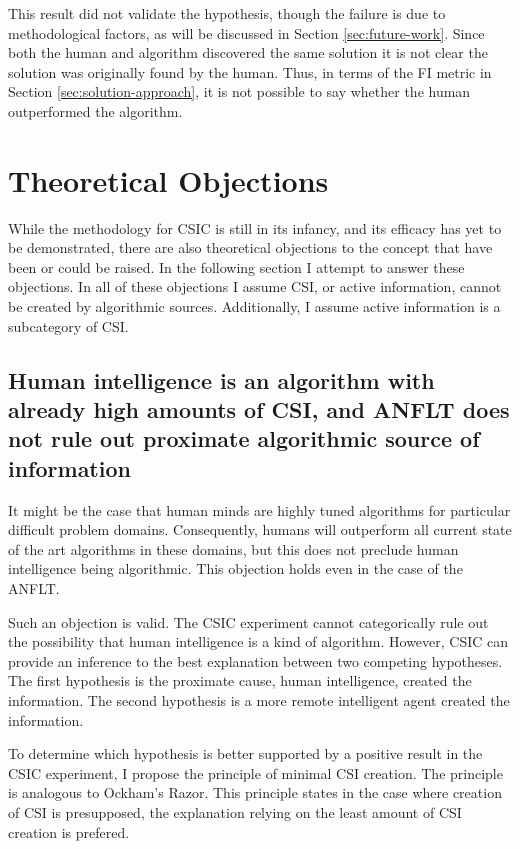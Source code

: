 This result did not validate the hypothesis, though the failure is  due to methodological factors, as will be discussed in Section \ref{sec:future-work}.  Since both the human and algorithm discovered the same solution it is not clear the solution was originally found by the human.  Thus, in terms of the FI metric in Section \ref{sec:solution-approach}, it is not possible to say whether the human outperformed the algorithm.

\section{Theoretical Objections}\label{sec:objections}

While the methodology for CSIC is still in its infancy, and its efficacy has yet to be demonstrated, there are also theoretical objections to the concept that have been or could be raised.  In the following section I attempt to answer these objections.  In all of these objections I assume CSI, or active information, cannot be created by algorithmic sources.  Additionally, I assume active information is a subcategory of CSI.

\subsection{Human intelligence is an algorithm with already high amounts of CSI, and ANFLT does not rule out proximate algorithmic source of information}

 It might be the case that human minds are highly tuned algorithms for particular difficult problem domains.  Consequently, humans will outperform all current state of the art algorithms in these domains, but this does not preclude human intelligence being algorithmic.  This objection holds even in the case of the ANFLT.

 Such an objection is valid.  The CSIC experiment cannot categorically rule out the possibility that human intelligence is a kind of algorithm.  However, CSIC can provide an inference to the best explanation between two competing hypotheses.  The first hypothesis is the proximate cause, human intelligence, created the information.  The second hypothesis is a more remote intelligent agent created the information.

To determine which hypothesis is better supported by a positive result in the CSIC experiment, I propose the principle of minimal CSI creation.  The principle is analogous to Ockham's Razor.  This principle states in the case where creation of CSI is presupposed, the explanation relying on the least amount of CSI creation is prefered.

